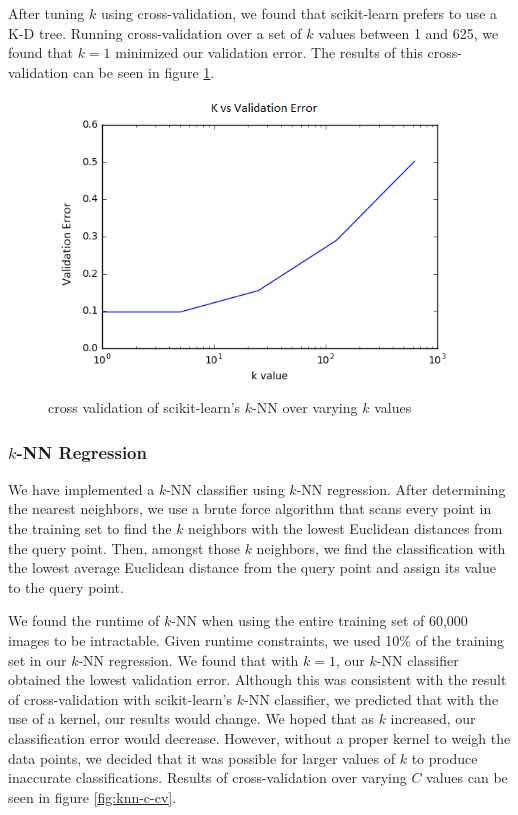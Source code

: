 \documentclass{article} %
\begin{document}
After tuning $k$ using cross-validation, we found that scikit-learn prefers to
use a K-D tree. Running cross-validation over a set of $k$ values between
1 and 625, we found that $k = 1$ minimized our validation error. The results of
this cross-validation can be seen in figure \ref{fig:sklearn-knn-k-cv}.

\begin{figure}[h]
\includegraphics[width=\textwidth]{sklearn-knn-k-cv.png}
\caption{cross validation of scikit-learn's $k$-NN over varying $k$ values}
\label{fig:sklearn-knn-k-cv}
\end{figure}

\subsubsection{$k$-NN Regression}
We have implemented a $k$-NN classifier using
$k$-NN regression. After determining the nearest neighbors,
we use a brute force algorithm that scans
every point in the training set to find the $k$ neighbors with the lowest
Euclidean distances from the query point. Then, amongst those $k$ neighbors,
we find the classification with the lowest average Euclidean distance from
the query point and assign its value to the query point.

We found the runtime of $k$-NN when using the entire training set of 60,000
images to be intractable. Given runtime constraints,
we used 10\% of the training set in our $k$-NN regression.
We found that with $k = 1$, our $k$-NN classifier obtained the lowest validation
error. Although this was consistent with the result of cross-validation with
scikit-learn's
$k$-NN classifier, we predicted that with the use of a kernel, our results would change.
We hoped that as $k$
increased, our classification error would decrease. However, without a
proper kernel to weigh the data points, we decided that it was possible for
larger values of $k$ to produce inaccurate classifications.
Results of cross-validation over varying $C$ values can be seen in figure \ref{fig:knn-c-cv}.
\end{document}
